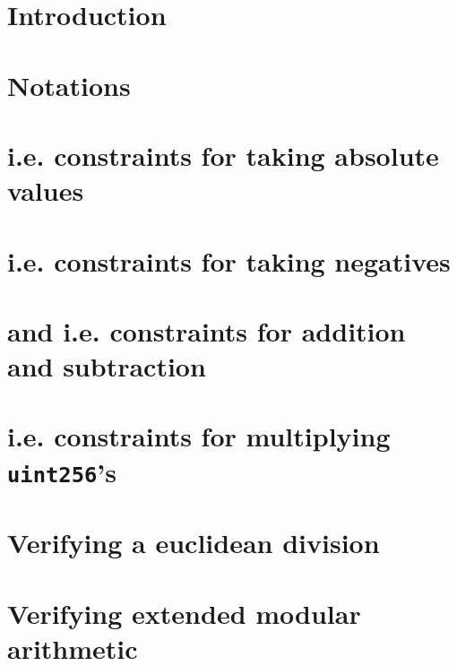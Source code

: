 \section{Introduction}                                                                                \label{alu: introduction}                    
\section{Notations}                                                                                   \label{alu: notations}                       
\section{\setAbsoluteValue{} i.e. constraints for taking absolute values}                             \label{alu: absolute value}                  
\section{\setNegative{} i.e. constraints for taking negatives}                                        \label{alu: negatives}                       
\section{\setAddition{} and \setSubtraction{} i.e. constraints for addition and subtraction}          \label{alu: addition and subtraction }       
\section{\setMultiplication{} i.e. constraints for multiplying \texttt{uint256}'s}                    \label{alu: multiplication}                  
\section{Verifying a euclidean division}                                                              \label{alu: euclidean division}              
\section{Verifying extended modular arithmetic}                                                       \label{alu: extended modular arithmetic}     
